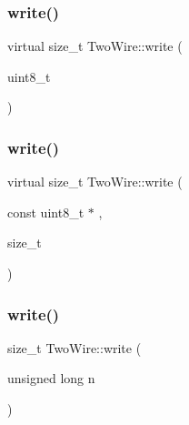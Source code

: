 \mbox{\label{class_two_wire_a6850a6e981a687cc57791670121664cb}} 
\subsubsection{\texorpdfstring{write()}{write()}\hspace{0.1cm}{\footnotesize\ttfamily [1/6]}}
{\footnotesize\ttfamily virtual size\+\_\+t Two\+Wire\+::write (\begin{DoxyParamCaption}\item[{uint8\+\_\+t}]{ }\end{DoxyParamCaption})\hspace{0.3cm}{\ttfamily [virtual]}}

\mbox{\label{class_two_wire_aae4d6ff65d9d4953e40ebeeccd908615}} 
\subsubsection{\texorpdfstring{write()}{write()}\hspace{0.1cm}{\footnotesize\ttfamily [2/6]}}
{\footnotesize\ttfamily virtual size\+\_\+t Two\+Wire\+::write (\begin{DoxyParamCaption}\item[{const uint8\+\_\+t $\ast$}]{,  }\item[{size\+\_\+t}]{ }\end{DoxyParamCaption})\hspace{0.3cm}{\ttfamily [virtual]}}

\mbox{\label{class_two_wire_a0c9d09ead8fcddf2a84781fe77d3c975}} 
\subsubsection{\texorpdfstring{write()}{write()}\hspace{0.1cm}{\footnotesize\ttfamily [3/6]}}
{\footnotesize\ttfamily size\+\_\+t Two\+Wire\+::write (\begin{DoxyParamCaption}\item[{unsigned long}]{n }\end{DoxyParamCaption})\hspace{0.3cm}{\ttfamily [inline]}}

